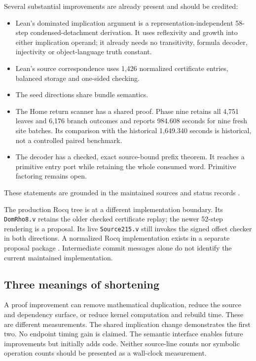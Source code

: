 \documentclass[11pt,letterpaper]{article}
\newcommand{\code}[1]{\texttt{#1}}
\begin{document}
Several substantial improvements are already present and should be credited:
\begin{itemize}
\item Lean's dominated implication argument is a representation-independent
58-step condensed-detachment derivation. It uses reflexivity and growth into
either implication operand; it already needs no transitivity, formula decoder,
injectivity or object-language truth constant.
\item Lean's source correspondence uses 1,426 normalized certificate entries,
balanced storage and one-sided checking.
\item The seed directions share bundle semantics.
\item The Home return scanner has a shared proof. Phase nine retains all 4,751
leaves and 6,176 branch outcomes and reports 984.608 seconds for nine fresh site
batches. Its comparison with the historical 1,649.340 seconds is historical,
not a controlled paired benchmark.
\item The decoder has a checked, exact source-bound prefix theorem. It reaches
a primitive entry port while retaining the whole consumed word. Primitive
factoring remains open.
\end{itemize}
These statements are grounded in the maintained sources and status records
\cite{core,phase9,decoder,rho-status}.

The production Rocq tree is at a different implementation boundary. Its
\code{DomRho8.v} retains the older checked certificate replay; the newer 52-step
rendering is a proposal. Its live \code{Source215.v} still invokes the signed
offset checker in both directions. A normalized Rocq implementation exists in
a separate proposal package \cite{rho-status,rocq-source,normalized}. Intermediate
commit messages alone do not identify the current maintained implementation.

\subsection{Three meanings of shortening}

A proof improvement can remove mathematical duplication, reduce the source and
dependency surface, or reduce kernel computation and rebuild time. These are
different measurements. The shared implication change demonstrates the first
two. No endpoint timing gain is claimed. The semantic interface enables future
improvements but initially adds code. Neither source-line counts nor symbolic
operation counts should be presented as a wall-clock measurement.
\end{document}
